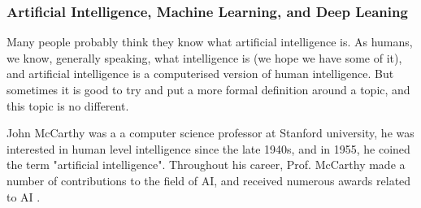 \documentclass[conference]{IEEEtran}
\begin{document}

\subsubsection{Artificial Intelligence, Machine Learning, and Deep Leaning}
Many people probably think they know what artificial intelligence is. As humans, we know, generally speaking, what intelligence is (we hope we have some of it), and artificial intelligence is a computerised version of human intelligence. But sometimes it is good to try and put a more formal definition around a topic, and this topic is no different. 

John McCarthy was a a computer science professor at Stanford university, he was interested in human level intelligence since the late 1940s, and in 1955, he coined the term "artificial intelligence". Throughout his career, Prof. McCarthy made a number of contributions to the field of AI, and received numerous awards related to AI \cite{mccarthy1}. 
\end{document}
